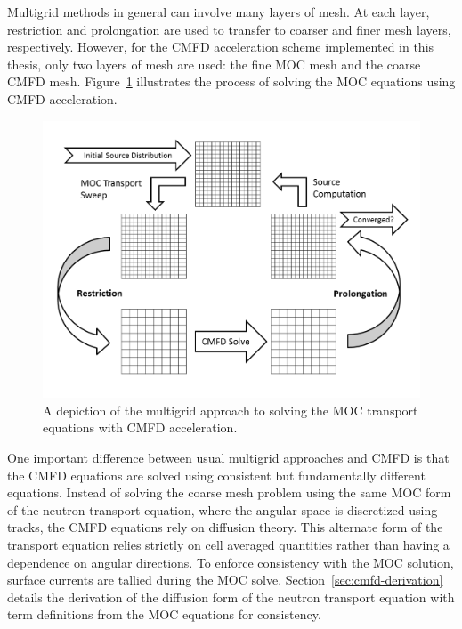 Multigrid methods in general can involve many layers of mesh. At each layer, restriction and prolongation are used to transfer to coarser and finer mesh layers, respectively. However, for the CMFD acceleration scheme implemented in this thesis, only two layers of mesh are used: the fine MOC mesh and the coarse CMFD mesh. Figure~\ref{fig:multigrid-cmfd} illustrates the process of solving the MOC equations using CMFD acceleration.
\begin{figure}[h!] 
	\centering 
	\includegraphics[width=\linewidth]{figures/multigrid-cmfd.PNG}
	\caption[]{A depiction of the multigrid approach to solving the MOC transport equations with CMFD acceleration.}
	\label{fig:multigrid-cmfd}
\end{figure}

One important difference between usual multigrid approaches and CMFD is that the CMFD equations are solved using consistent but fundamentally different equations. Instead of solving the coarse mesh problem using the same MOC form of the neutron transport equation, where the angular space is discretized using tracks, the CMFD equations rely on diffusion theory. This alternate form of the transport equation relies strictly on cell averaged quantities rather than having a dependence on angular directions. To enforce consistency with the MOC solution, surface currents are tallied during the MOC solve. Section~\ref{sec:cmfd-derivation} details the derivation of the diffusion form of the neutron transport equation with term definitions from the MOC equations for consistency.

